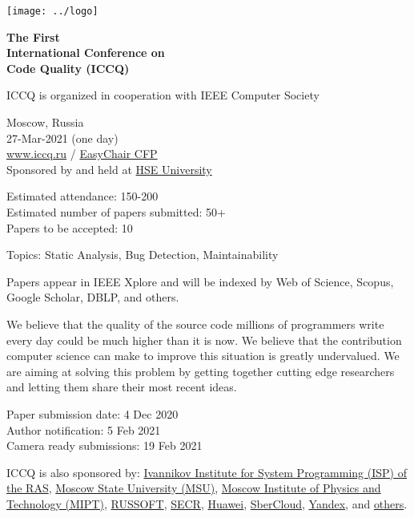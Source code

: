\documentclass[12pt,oneside]{article}
\begin{document}
\selectfont
\raggedbottom
\raggedright
\setlength{\topskip}{6pt}
\setlength{\parindent}{0pt} %
\setlength{\parskip}{6pt} %

\texttt{[image: ../logo]}

\textcolor{xred}{\bfseries
{\large The First} \\
{\Large International Conference on\\[3pt]
Code Quality (ICCQ)}}

ICCQ is organized in cooperation with IEEE Computer Society

\vspace{6pt}

Moscow, Russia \\
27-Mar-2021 (one day) \\
\href{https://www.iccq.ru}{www.iccq.ru} / \href{https://easychair.org/cfp/ICCQ20}{EasyChair CFP}\\

Sponsored by and held at \href{https://www.hse.ru/en/}{HSE University}

Estimated attendance: 150-200 \\
Estimated number of papers submitted: 50+ \\
Papers to be accepted: 10

\vspace{6pt}

Topics: Static Analysis, Bug Detection, Maintainability

Papers appear in IEEE Xplore\textsuperscript{\textregistered}
and will be indexed by Web of Science, Scopus, Google Scholar, DBLP, and others.

We believe that the quality of the source code millions of programmers
write every day could be much higher than it is now. We believe that the
contribution computer science can make to improve this situation is greatly
undervalued. We are aiming at solving this problem by getting
together cutting edge researchers and letting them share their most recent ideas.

\vspace{6pt}

Paper submission date: 4 Dec 2020 \\
Author notification: 5 Feb 2021 \\
Camera ready submissions: 19 Feb 2021

\vspace{6pt}

ICCQ is also sponsored by:
\href{https://www.ispras.ru/en/}{Ivannikov Institute for System Programming (ISP) of the RAS},
\href{https://www.msu.ru/}{Moscow State University (MSU)},
\href{https://mipt.ru/english/}{Moscow Institute of Physics and Technology (MIPT)},
\href{https://russoft.org/en/}{RUSSOFT},
\href{https://2021.secrus.org/?lang=en}{SECR},
\href{https://www.huawei.com}{Huawei},
\href{https://sbercloud.ru/}{SberCloud},
\href{https://yandex.ru/}{Yandex},
and \href{https://www.iccq.ru/#partners}{others}.
\end{document}
